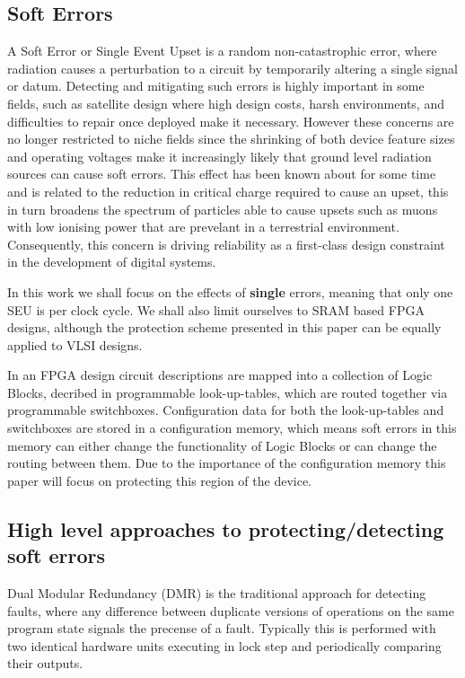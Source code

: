 \subsection{Soft Errors}
A Soft Error or Single Event Upset is a random non-catastrophic error, where radiation causes
a perturbation to a circuit by temporarily altering a single signal or datum. 
Detecting and mitigating such errors is highly important in some fields, such as satellite design 
where high design costs, harsh environments, and difficulties to repair once deployed make it necessary. 
However these concerns are no longer restricted to niche fields
since the shrinking of both device feature sizes and operating voltages make it increasingly likely 
that ground level radiation sources can cause soft errors.
This effect has been known about for some time \cite{normand1996single} and is related to 
the reduction in critical charge required to cause an upset, this in turn broadens the spectrum of
particles able to cause upsets such as muons with low ionising power that are prevelant in a terrestrial
environment.
Consequently, this concern is driving reliability as a first-class design constraint in the 
development of digital systems.

In this work we shall focus on the effects of \textbf{single} errors, meaning that only one SEU is
per clock cycle.
We shall also limit ourselves to SRAM based FPGA designs, although the protection scheme 
presented in this paper can be equally applied to VLSI designs.

In an FPGA design circuit descriptions are mapped into a collection of Logic Blocks, decribed in programmable look-up-tables,
which are routed together via programmable switchboxes.
Configuration data for both the look-up-tables and switchboxes are stored in a configuration memory, which means soft errors
in this memory can either change the functionality of Logic Blocks or can change the routing between them.  
Due to the importance of the configuration memory this paper will focus on protecting this
region of the device.  

\subsection{High level approaches to protecting/detecting soft errors}

Dual Modular Redundancy (DMR) is the traditional approach for detecting faults,
where any difference between duplicate versions of operations on the same program state signals
the precense of a fault.
Typically this is performed with two identical hardware units executing in lock step and
periodically comparing their outputs.

